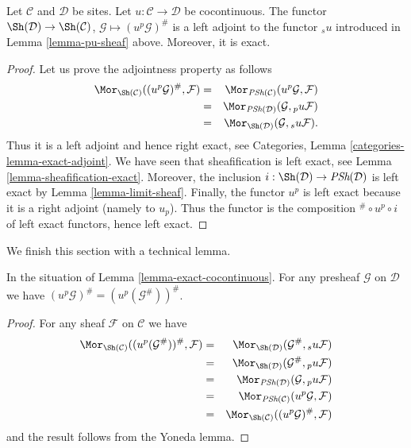 \begin{lemma}
\label{lemma-exact-cocontinuous}
Let $\mathcal{C}$ and $\mathcal{D}$ be sites.
Let $u : \mathcal{C} \to \mathcal{D}$ be cocontinuous.
The functor
$\Sh(\mathcal{D}) \to \Sh(\mathcal{C})$,
$\mathcal{G} \mapsto (u^p\mathcal{G})^\#$
is a left adjoint to the functor ${}_su$ introduced
in Lemma \ref{lemma-pu-sheaf} above. Moreover, it
is exact.
\end{lemma}

\begin{proof}
Let us prove the adjointness property as follows
\begin{eqnarray*}
\Mor_{\Sh(\mathcal{C})}
((u^p\mathcal{G})^\#, \mathcal{F})
& = &
\Mor_{\textit{PSh}(\mathcal{C})}
(u^p\mathcal{G}, \mathcal{F}) \\
& = &
\Mor_{\textit{PSh}(\mathcal{D})}
(\mathcal{G}, {}_pu\mathcal{F}) \\
& = &
\Mor_{\Sh(\mathcal{D})}
(\mathcal{G}, {}_su\mathcal{F}).
\end{eqnarray*}
Thus it is a left adjoint and hence right exact,
see Categories, Lemma \ref{categories-lemma-exact-adjoint}.
We have seen that sheafification is left exact,
see Lemma \ref{lemma-sheafification-exact}.
Moreover, the inclusion
$i : \Sh(\mathcal{D}) \to \textit{PSh}(\mathcal{D})$
is left exact by Lemma \ref{lemma-limit-sheaf}. Finally, the functor
$u^p$ is left exact because it is a right adjoint
(namely to $u_p$). Thus the functor is the composition
${}^\# \circ u^p \circ i$ of left exact functors,
hence left exact.
\end{proof}

\noindent
We finish this section with a technical lemma.

\begin{lemma}
\label{lemma-technical-pu}
In the situation of Lemma \ref{lemma-exact-cocontinuous}.
For any presheaf $\mathcal{G}$ on $\mathcal{D}$
we have $(u^p\mathcal{G})^\# = (u^p(\mathcal{G}^\#))^\#$.
\end{lemma}

\begin{proof}
For any sheaf $\mathcal{F}$ on $\mathcal{C}$ we have
\begin{eqnarray*}
\Mor_{\Sh(\mathcal{C})}((u^p(\mathcal{G}^\#))^\#, \mathcal{F})
& = &
\Mor_{\Sh(\mathcal{D})}(\mathcal{G}^\#, {}_su\mathcal{F}) \\
& = &
\Mor_{\Sh(\mathcal{D})}(\mathcal{G}^\#, {}_pu\mathcal{F}) \\
& = &
\Mor_{\textit{PSh}(\mathcal{D})}(\mathcal{G}, {}_pu\mathcal{F}) \\
& = &
\Mor_{\textit{PSh}(\mathcal{C})}(u^p\mathcal{G}, \mathcal{F}) \\
& = &
\Mor_{\Sh(\mathcal{C})}((u^p\mathcal{G})^\#, \mathcal{F})
\end{eqnarray*}
and the result follows from the Yoneda lemma.
\end{proof}

